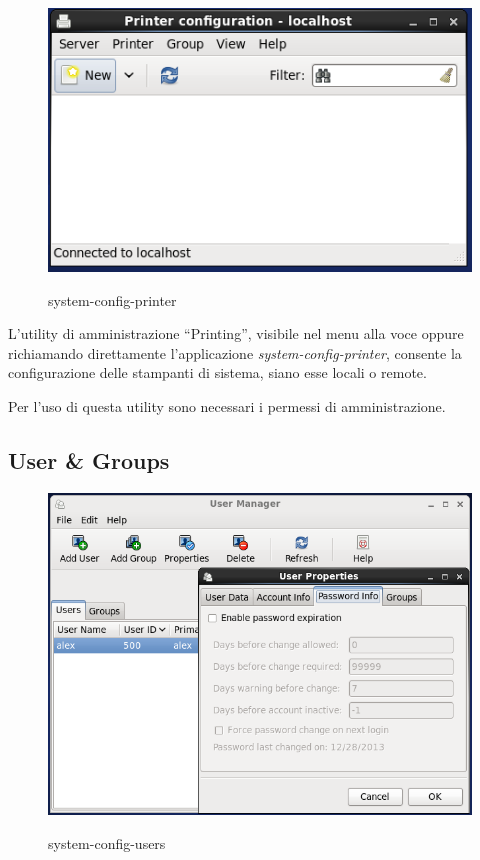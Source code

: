 \begin{figure}[!ht]
 \centering
 \includegraphics[scale=0.6]{Immagini/sys_conf_printing.png}
 \label{fig:System Config Printer}
 \caption{system-config-printer}
\end{figure}

L'utility di amministrazione ``Printing'', visibile nel menu alla voce  oppure richiamando direttamente l'applicazione \textit{system-config-printer}, consente la configurazione delle stampanti di sistema, siano esse locali o remote. 

Per l'uso di questa utility sono necessari i permessi di amministrazione.

\subsection{User \& Groups}

\begin{figure}[!ht]
 \centering
 \includegraphics[scale=0.5]{Immagini/sys_conf_user1.png}
 \label{fig:System Config user}
 \caption{system-config-users}
\end{figure}




